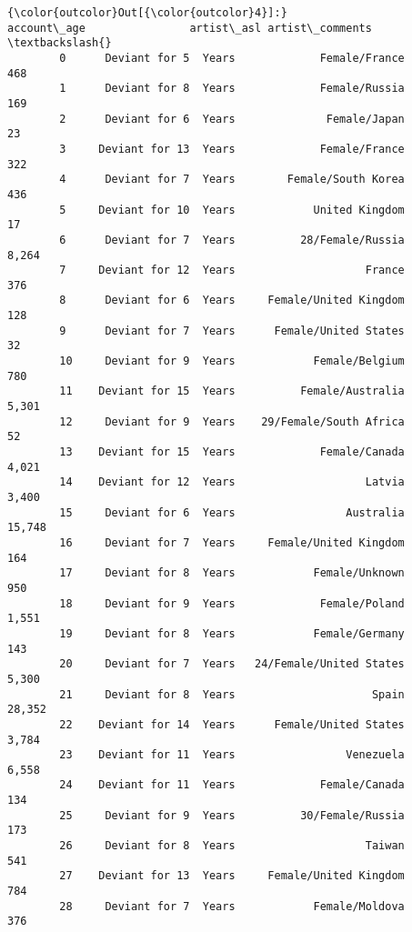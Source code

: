 \documentclass[11pt]{article}
\begin{document}
\begin{Verbatim}[commandchars=\\\{\}]
{\color{outcolor}Out[{\color{outcolor}4}]:}                 account\_age                artist\_asl artist\_comments  \textbackslash{}
        0      Deviant for 5  Years             Female/France            468    
        1      Deviant for 8  Years             Female/Russia            169    
        2      Deviant for 6  Years              Female/Japan             23    
        3     Deviant for 13  Years             Female/France            322    
        4      Deviant for 7  Years        Female/South Korea            436    
        5     Deviant for 10  Years            United Kingdom             17    
        6      Deviant for 7  Years          28/Female/Russia          8,264    
        7     Deviant for 12  Years                    France            376    
        8      Deviant for 6  Years     Female/United Kingdom            128    
        9      Deviant for 7  Years      Female/United States             32    
        10     Deviant for 9  Years            Female/Belgium            780    
        11    Deviant for 15  Years          Female/Australia          5,301    
        12     Deviant for 9  Years    29/Female/South Africa             52    
        13    Deviant for 15  Years             Female/Canada          4,021    
        14    Deviant for 12  Years                    Latvia          3,400    
        15     Deviant for 6  Years                 Australia         15,748    
        16     Deviant for 7  Years     Female/United Kingdom            164    
        17     Deviant for 8  Years            Female/Unknown            950    
        18     Deviant for 9  Years             Female/Poland          1,551    
        19     Deviant for 8  Years            Female/Germany            143    
        20     Deviant for 7  Years   24/Female/United States          5,300    
        21     Deviant for 8  Years                     Spain         28,352    
        22    Deviant for 14  Years      Female/United States          3,784    
        23    Deviant for 11  Years                 Venezuela          6,558    
        24    Deviant for 11  Years             Female/Canada            134    
        25     Deviant for 9  Years          30/Female/Russia            173    
        26     Deviant for 8  Years                    Taiwan            541    
        27    Deviant for 13  Years     Female/United Kingdom            784    
        28     Deviant for 7  Years            Female/Moldova            376    

\end{Verbatim}
\end{document}
